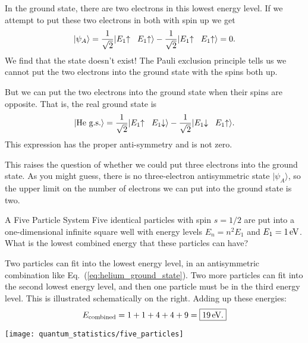 In the ground state, there are two electrons in this lowest
energy level.  If we attempt to put these two electrons in both with
spin up we get
\begin{equation}
  |\psi_A\rangle = \frac{1}{\sqrt 2}|E_1\hspace{-1mm}\uparrow\hspace{2mm} 
  E_1\hspace{-1mm}\uparrow\rangle 
  - \frac{1}{\sqrt 2}|E_1\hspace{-1mm}\uparrow\hspace{2mm} 
  E_1\hspace{-1mm}\uparrow\rangle 
  = 0.
\end{equation}
We find that the state doesn't exist!  The Pauli exclusion principle
tells us we cannot put the two electrons into the ground state with
the spins both up.

But we can put the two electrons into the ground state when their spins
are opposite.  That is, the real ground state is
\begin{equation}
  |\text{He g.s.}\rangle = 
  \frac{1}{\sqrt 2}|E_1\hspace{-1mm}\uparrow\hspace{2mm} 
    E_1\hspace{-1mm}\downarrow\rangle -
  \frac{1}{\sqrt 2}|E_1\hspace{-1mm}\downarrow\hspace{2mm} 
    E_1\hspace{-1mm}\uparrow\rangle.
    \label{eq:helium_ground_state}
\end{equation}
This expression has the proper anti-symmetry and is not zero.

This raises the question of whether we could put three electrons into
the ground state.  As you might guess, there is no three-electron
antisymmetric state $|\psi_A\rangle$, so the upper limit on the number
of electrons we can put into the ground state is two.

\begin{example}{A Five Particle System}
\label{example:five_particles}
Five identical particles with spin $s=1/2$ are put into a
one-dimensional infinite square well with energy levels $E_n=n^2 E_1$
and $E_1=1\,\mbox{eV}$.  What is the lowest combined energy that these
particles can have?

\begin{minipage}{3.4in}
\solution Two particles can fit into the lowest energy level, in an 
antisymmetric combination like Eq.~(\ref{eq:helium_ground_state}).  Two
more particles can fit into the second lowest energy level, and then one
particle must be in the third energy level.  This is illustrated
schematically on the right.  Adding up these energies:
\[
E_\text{combined} = 1 + 1 + 4 + 4 + 9 = \boxed{19\,\mbox{eV}.}
\]
\end{minipage}
\hspace{0.2in}
\begin{minipage}{1.3in}
\texttt{[image: quantum\_statistics/five\_particles]}
\end{minipage}

\end{example}

